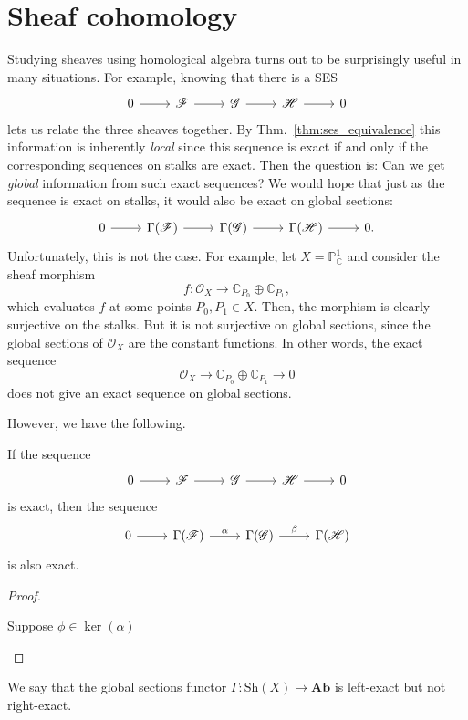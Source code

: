 \section{Sheaf cohomology}
Studying sheaves using homological algebra turns out to be surprisingly
useful in many situations. For example, knowing that there is a SES
\[
  \begin{tikzcd}
    0 \rar & \mathscr{F} \rar & \mathscr{G} \rar &
    \mathscr{H} \rar & 0
  \end{tikzcd}
\]
lets us relate the three sheaves together. By Thm.~\ref{thm:ses_equivalence}
this information is inherently \emph{local} since this sequence is exact
if and only if the corresponding sequences on stalks are exact.
Then the question is: Can we get \emph{global} information from
such exact sequences? We would hope that just as the sequence is exact
on stalks, it would also be exact on global sections:
\[
\begin{tikzcd}
  0 \rar & \Gamma(\mathscr{F}) \rar & \Gamma(\mathscr{G})
  \rar & \Gamma(\mathscr{H}) \rar & 0.
\end{tikzcd}
\]
Unfortunately, this is not the case. For example, let
$X=\mathbb{P}^{1}_{\mathbb{C}}$ and consider the sheaf morphism
\[f:\mathscr{O}_{X}\to\mathbb{C}_{P_{0}}\oplus\mathbb{C}_{P_{1}},\]
which evaluates $f$ at some points $P_{0},P_{1}\in X$. Then, the
morphism is clearly surjective on the stalks. But it is not surjective
on global sections, since the global sections of $\mathscr{O}_{X}$ are
the constant functions. In other words, the exact sequence
\[\mathscr{O}_{X}\to\mathbb{C}_{P_{0}}\oplus\mathbb{C}_{P_{1}}\to 0\]
does not give an exact sequence on global sections.

However, we have the following.
\begin{prop}
  If the sequence
  \[
  \begin{tikzcd}
    0\rar & \mathscr{F}\rar & \mathscr{G}\rar & \mathscr{H}\rar & 0
  \end{tikzcd}
  \]
  is exact, then the sequence
  \[
  \begin{tikzcd}
    0\rar & \Gamma(\mathscr{F})\rar{\alpha} & \Gamma(\mathscr{G})\rar{\beta}
    & \Gamma(\mathscr{H})
  \end{tikzcd}
  \]
  is also exact.
\end{prop}
\begin{proof}\hfill
  \begin{description}[style=nextline]
    \item[Exactness at $\Gamma(\mathscr{F})$]
          Suppose $\phi\in\ker(\alpha)$ %
  \end{description}

\end{proof}
\begin{cat}
  We say that the global sections functor $\Gamma: \text{Sh}(X)\to \textbf{Ab}$ is left-exact but not right-exact.
\end{cat}


